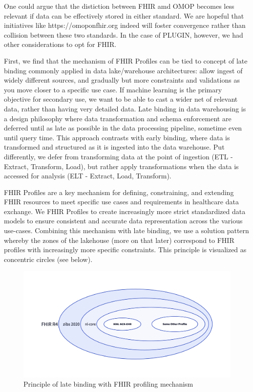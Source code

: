 \documentclass[
  authoryear]{elsarticle}
\begin{document}
One could argue that the distiction between FHIR amd OMOP becomes less
relevant if data can be effectively stored in either standard. We are
hopeful that initiatives like https://omoponfhir.org indeed will foster
convergence rather than collision between these two standards. In the
case of PLUGIN, however, we had other considerations to opt for FHIR.

First, we find that the mechanism of FHIR Profiles can be tied to
concept of late binding commonly applied in data lake/warehouse
architectures: allow ingest of widely different sources, and gradually
but more constraints and validations as you move closer to a specific
use case. If machine learning is the primary objective for secondary
use, we want to be able to cast a wider net of relevant data, rather
than having very detailed data. Late binding in data warehousing is a
design philosophy where data transformation and schema enforcement are
deferred until as late as possible in the data processing pipeline,
sometime even until query time. This approach contrasts with early
binding, where data is transformed and structured as it is ingested into
the data warehouse. Put differently, we defer from transforming data at
the point of ingestion (ETL - Extract, Transform, Load), but rather
apply transformations when the data is accessed for analysis (ELT -
Extract, Load, Transform).

FHIR Profiles are a key mechanism for defining, constraining, and
extending FHIR resources to meet specific use cases and requirements in
healthcare data exchange. We FHIR Profiles to create increasingly more
strict standardized data models to ensure consistent and accurate data
representation across the various use-cases. Combining this mechanism
with late binding, we use a solution pattern whereby the zones of the
lakehouse (more on that later) correspond to FHIR profiles with
increasingly more specific constraints. This principle is visualized as
concentric circles (see below).

\begin{figure}[H]

{\centering \includegraphics{late-binding.png}

}

\caption{Principle of late binding with FHIR profiling mechanism}

\end{figure}%
\end{document}
